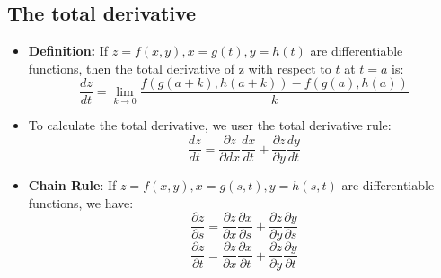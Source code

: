 \documentclass{article}
\begin{document}
  \subsection*{The total derivative}
  \begin{itemize}
    \item \textbf{Definition:} If $z = f(x,y), x = g(t),y = h(t)$ are differentiable functions, then the total derivative of z with respect to $t$ at $t = a$ is:
    $$
      \frac{dz}{dt} = \lim_{k \to 0} \frac{f(g(a+k), h(a+k)) - f(g(a), h(a))}{k}
    $$

    \item To calculate the total derivative, we user the total derivative rule:
    $$
      \frac{dz}{dt} = \frac{\partial z}{\partial dx} \frac{dx}{dt} + \frac{\partial z}{\partial y} \frac{dy}{dt}
    $$

    \item \textbf{Chain Rule}: If $z = f(x,y),x=g(s,t),y = h(s,t)$ are differentiable functions, we have:
    $$
      \frac{\partial z}{\partial s} = \frac{\partial z}{\partial x} \frac{\partial x}{\partial s} + \frac{\partial z}{\partial y} \frac{\partial y}{\partial s}
    $$
    $$
      \frac{\partial z}{\partial t} = \frac{\partial z}{\partial x} \frac{\partial x}{\partial t} + \frac{\partial z}{\partial y} \frac{\partial y}{\partial t}
    $$
  \end{itemize}
\end{document}
